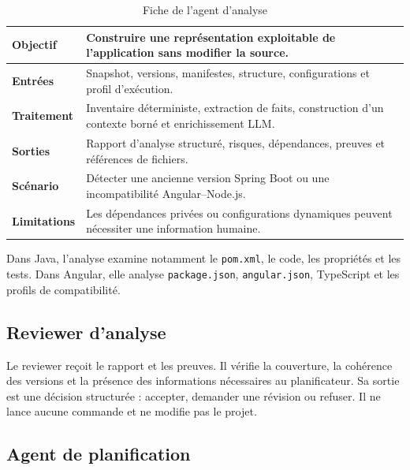 \begin{table}[H]
    \centering
    \small
    \begin{tabularx}{\textwidth}{|>{\bfseries\RaggedRight\arraybackslash}p{3.2cm}|>{\RaggedRight\arraybackslash}X|}
        \hline
        Objectif & Construire une représentation exploitable de l'application sans modifier la source. \\
        \hline
        Entrées & Snapshot, versions, manifestes, structure, configurations et profil d'exécution. \\
        \hline
        Traitement & Inventaire déterministe, extraction de faits, construction d'un contexte borné et enrichissement LLM. \\
        \hline
        Sorties & Rapport d'analyse structuré, risques, dépendances, preuves et références de fichiers. \\
        \hline
        Scénario & Détecter une ancienne version Spring Boot ou une incompatibilité Angular--Node.js. \\
        \hline
        Limitations & Les dépendances privées ou configurations dynamiques peuvent nécessiter une information humaine. \\
        \hline
    \end{tabularx}
    \caption{Fiche de l'agent d'analyse}
    \label{tab:agent-analyse-ch4}
\end{table}

Dans Java, l'analyse examine notamment le \texttt{pom.xml}, le code, les propriétés et les tests. Dans Angular, elle analyse \texttt{package.json}, \texttt{angular.json}, TypeScript et les profils de compatibilité.

\subsection{Reviewer d'analyse}

Le reviewer reçoit le rapport et les preuves. Il vérifie la couverture, la cohérence des versions et la présence des informations nécessaires au planificateur. Sa sortie est une décision structurée : accepter, demander une révision ou refuser. Il ne lance aucune commande et ne modifie pas le projet.

\subsection{Agent de planification}

